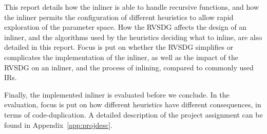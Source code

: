
This report details how the inliner is able to handle recursive functions, and
how the inliner permits the configuration of different heuristics to allow rapid
exploration of the parameter space. How the RVSDG affects the design of an
inliner, and the algorithms used by the heuristics deciding what to inline, are
also detailed in this report. Focus is put on whether the RVSDG simplifies or
complicates the implementation of the inliner, as well as the impact of the
RVSDG on an inliner, and the process of inlining, compared to commonly used IRs.

Finally, the implemented inliner is evaluated before we conclude. In the
evaluation, focus is put on how different heuristics have different
consequences, in terms of code-duplication. A detailed description of the
project assignment can be found in Appendix~\ref{app:projdesc}.
